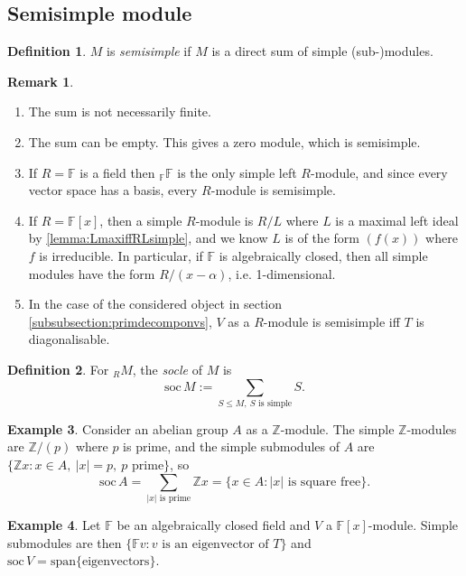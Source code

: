 \documentclass[a4paper]{article}
\newcommand{\F}{\mathbb{F}}
\newcommand{\Z}{\mathbb{Z}}
\newcommand{\soc}{\text{soc}\,}
\newcommand{\spa}{\text{span}}
\theoremstyle{definition}
\newtheorem{defn}{Definition}[subsection]
\newtheorem{example}[defn]{Example}
\newtheorem*{remark}{Remark}
\begin{document}
\subsection{Semisimple module}
\begin{defn}
$M$ is \textit{semisimple} if $M$ is a direct sum of simple (sub-)modules.
\end{defn}
\begin{remark}
\begin{enumerate}
\item The sum is not necessarily finite.
\item The sum can be empty. This gives a zero module, which is semisimple.
\item If $R=\F$ is a field then $_\F \F$ is the only simple left $R$-module, and since every vector space has a basis, every $R$-module is semisimple.
\item If $R=\F[x]$, then a simple $R$-module is $R/L$ where $L$ is a maximal left ideal by \ref{lemma:LmaxiffRLsimple}, and we know $L$ is of the form $(f(x))$ where $f$ is irreducible. In particular, if $\F$ is algebraically closed, then all simple modules have the form $R/(x-\alpha)$, i.e. 1-dimensional.
\item In the case of the considered object in section \ref{subsubsection:primdecomponvs}, $V$ as a $R$-module is semisimple iff $T$ is diagonalisable.
\end{enumerate}
\end{remark}

\begin{defn}
For $_RM$, the \textit{socle} of $M$ is
\[
\soc M:=\sum_{S\leq M,\ S\text{ is simple}} S.
\]
\end{defn}
\begin{example}
Consider an abelian group $A$ as a $\Z$-module. The simple $\Z$-modules are $\Z/(p)$ where $p$ is prime, and the simple submodules of $A$ are $\{\Z x:x\in A,\ |x|=p,\ p\text{ prime}\}$, so
\[
\soc A=\sum_{|x|\text{ is prime}}\Z x=\{x\in A:|x|\text{ is square free}\}.
\]
\end{example}

\begin{example}
Let $\F$ be an algebraically closed field and $V$ a $\F[x]$-module. Simple submodules are then $\{\F v:v\text{ is an eigenvector of }T\}$ and $\soc V=\spa\{\text{eigenvectors}\}$.
\end{example}
\end{document}
